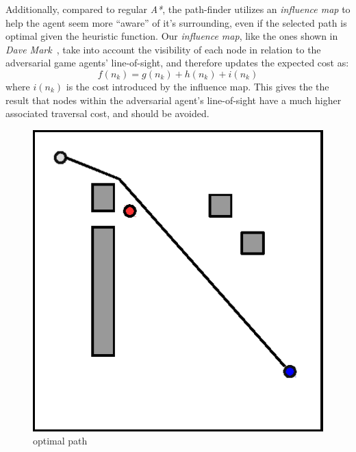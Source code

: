\documentclass[a4paper, twocolumn]{article}
\begin{document}
    Additionally, compared to regular \emph{A*}, the path-finder utilizes an \emph{influence map} to help the agent seem more ``aware'' of it's surrounding, even if the selected path is optimal given the heuristic function. Our \emph{influence map}, like the ones shown in \emph{Dave Mark}~\cite{mark2015modular}, take into account the visibility of each node in relation to the adversarial game agents' line-of-sight, and therefore updates the expected cost as:
	\begin{equation*}
		f(n_k) = g(n_k) + h(n_k) + i(n_k)
	\end{equation*} 
    where \(i(n_k)\) is the cost introduced by the influence map. This gives the the result that nodes within the adversarial agent's line-of-sight have a much higher associated traversal cost, and should be avoided. 
    \begin{minipage}{\linewidth}        	
    \centering
	\begin{minipage}{0.45\linewidth}
	\begin{figure}[H]
        \centering
		\includegraphics[width=\linewidth]{share/bad.eps}
		\caption{optimal path}
		\label{fig:optimal_path}
        \end{figure}
	\end{minipage}
	\hspace{0.00\linewidth}

\end{minipage}
\end{document}
